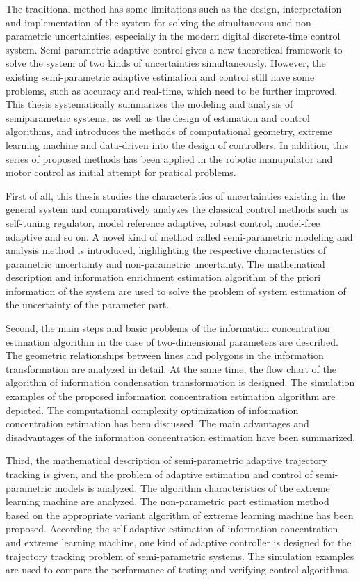 \begin{englishabstract}

The traditional method has some limitations such as the design, interpretation and implementation of the system for solving the simultaneous and non-parametric uncertainties, especially in the modern digital discrete-time control system. Semi-parametric adaptive control gives a new theoretical framework to solve the system of two kinds of uncertainties simultaneously. However, the existing semi-parametric adaptive estimation and control still have some problems, such as accuracy and real-time, which need to be further improved. This thesis systematically summarizes the modeling and analysis of semiparametric systems, as well as the design of estimation and control algorithms, and introduces the methods of computational geometry, extreme learning machine and data-driven into the design of controllers. In addition, this series of proposed methods has been applied in the robotic manupulator and motor control as initial attempt for pratical problems. 

First of all, this thesis studies the characteristics of uncertainties existing in the general system and comparatively analyzes the classical control methods such as self-tuning regulator, model reference adaptive, robust control, model-free adaptive and so on. A novel kind of method called semi-parametric modeling and analysis method is introduced, highlighting the respective characteristics of parametric uncertainty and non-parametric uncertainty. The mathematical description and information enrichment estimation algorithm of the priori information of the system are used to solve the problem of system estimation of the uncertainty of the parameter part.

Second, the main steps and basic problems of the information concentration estimation algorithm in the case of two-dimensional parameters are described. The geometric relationships between lines and polygons in the information transformation are analyzed in detail. At the same time, the flow chart of the algorithm of information condensation transformation is designed. The simulation examples of the proposed information concentration estimation algorithm are depicted. The computational complexity optimization of information concentration estimation has been discussed. The main advantages and disadvantages of the information concentration estimation have been summarized.

Third, the mathematical description of semi-parametric adaptive trajectory tracking is given, and the problem of adaptive estimation and control of semi-parametric models is analyzed. The algorithm characteristics of the extreme learning machine are analyzed. The non-parametric part estimation method based on the appropriate variant algorithm of extreme learning machine has been proposed. According the self-adaptive estimation of information concentration and extreme learning machine, one kind of  adaptive controller is designed for the trajectory tracking problem of semi-parametric systems. The simulation examples are used to compare the performance of testing and verifying control algorithms.


\end{englishabstract}
